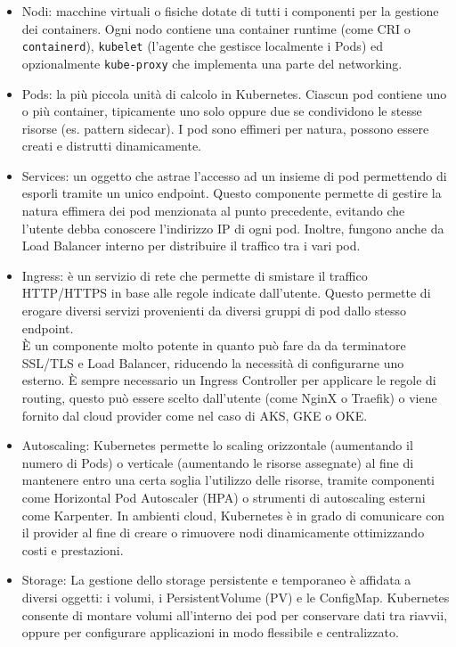 \documentclass[12pt,a4paper,openright,twoside]{book}
\begin{document}
\begin{itemize}
    \item {
        Nodi: macchine virtuali o fisiche dotate di tutti i componenti per la gestione dei containers. Ogni nodo contiene una container runtime (come CRI o \texttt{containerd}), \texttt{kubelet} (l'agente che gestisce localmente i Pods) ed opzionalmente \texttt{kube-proxy} che implementa una parte del networking.
    }
    \item {
        Pods: la più piccola unità di calcolo in Kubernetes. Ciascun pod contiene uno o più container, tipicamente uno solo oppure due se condividono le stesse risorse (es. pattern sidecar).
        I pod sono effimeri per natura, possono essere creati e distrutti dinamicamente.
    }
    \item {
        Services: un oggetto che astrae l'accesso ad un insieme di pod permettendo di esporli tramite un unico endpoint.
        Questo componente permette di gestire la natura effimera dei pod menzionata al punto precedente, evitando che l'utente debba conoscere l'indirizzo IP di ogni pod.
        Inoltre, fungono anche da Load Balancer interno per distribuire il traffico tra i vari pod.
    }
    \item {
        Ingress: è un servizio di rete che permette di smistare il traffico HTTP/HTTPS in base alle regole indicate dall'utente. Questo permette di erogare diversi servizi provenienti da diversi gruppi di pod dallo stesso endpoint.\\
        È un componente molto potente in quanto può fare da da terminatore SSL/TLS e Load Balancer, riducendo la necessità di configurarne uno esterno.
        È sempre necessario un Ingress Controller per applicare le regole di routing, questo può essere scelto dall'utente (come NginX o Traefik) o viene fornito dal cloud provider come nel caso di AKS, GKE o OKE. 
    }
    \item {
        Autoscaling: Kubernetes permette lo scaling orizzontale (aumentando il numero di Pods) o verticale (aumentando le risorse assegnate) al fine di mantenere entro una certa soglia l'utilizzo delle risorse,
        tramite componenti come Horizontal Pod Autoscaler (HPA) o strumenti di autoscaling esterni come Karpenter. 
        In ambienti cloud, Kubernetes è in grado di comunicare con il provider al fine di creare o rimuovere nodi dinamicamente ottimizzando costi e prestazioni.
    }
    \item {
        Storage: La gestione dello storage persistente e temporaneo è affidata a diversi oggetti: i volumi, i PersistentVolume (PV) e le ConfigMap.
        Kubernetes consente di montare volumi all'interno dei pod per conservare dati tra riavvii, oppure per configurare applicazioni in modo flessibile e centralizzato.
    }
\end{itemize}
\end{document}
